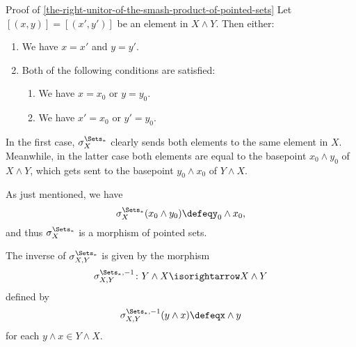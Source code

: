 \begin{Proof}{Proof of \cref{the-right-unitor-of-the-smash-product-of-pointed-sets}}%
    Let $[(x,y)]=[(x',y')]$ be an element in $X\wedge Y$. Then either:
    \begin{enumerate}
        \item We have $x=x'$ and $y=y'$.
        \item Both of the following conditions are satisfied:
            \begin{enumerate}
                \item We have $x=x_{0}$ or $y=y_{0}$.
                \item We have $x'=x_{0}$ or $y'=y_{0}$.
            \end{enumerate}
    \end{enumerate}
    In the first case, $\sigma^{\Sets_{*}}_{X}$ clearly sends both elements to the same element in $X$. Meanwhile, in the latter case both elements are equal to the basepoint $x_{0}\wedge y_{0}$ of $X\wedge Y$, which gets sent to the basepoint $y_{0}\wedge x_{0}$ of $Y\wedge X$.

    As just mentioned, we have
    \[
        \sigma^{\Sets_{*}}_{X}(x_{0}\wedge y_{0})%
        \defeq%
        y_{0}\wedge x_{0},%
    \]%
    and thus $\sigma^{\Sets_{*}}_{X}$ is a morphism of pointed sets.

    The inverse of $\sigma^{\Sets_{*}}_{X,Y}$ is given by the morphism
    \[
        \sigma^{\Sets_{*},-1}_{X,Y}
        \colon
        Y\wedge X
        \isorightarrow
        X\wedge Y
    \]%
    defined by
    \[
        \sigma^{\Sets_{*},-1}_{X,Y}(y\wedge x)%
        \defeq%
        x\wedge y
    \]%
    for each $y\wedge x\in Y\wedge X$.


\end{Proof}
